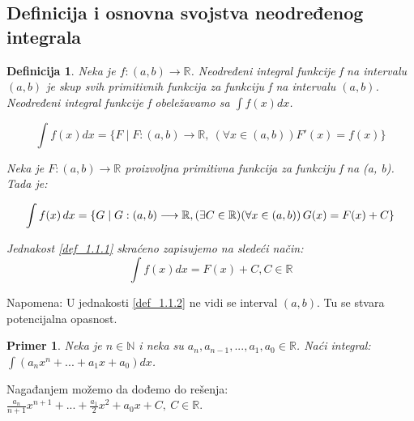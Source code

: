 \documentclass{article}
\newtheorem{definicija}{Definicija}[section]
\newtheorem{prim}{Primer}[section]
\begin{document}
\subsection{Definicija i osnovna svojstva neodređenog integrala}
\begin{definicijabox}
    \begin{definicija}
        Neka je $f: (a, b) \longrightarrow \mathbb{R}$.
        Neodređeni integral funkcije f na intervalu $(a, b)$ je
        skup svih primitivnih funkcija za funkciju f na intervalu
        $(a, b)$. Neodređeni integral funkcije f obeležavamo sa
        $\int f(x)dx$.\par
        $$\int f(x) dx = \{F \mid F: (a, b) \longrightarrow \mathbb{R},\
            (\forall x\in(a,b)) F'(x) = f(x)\}$$\par
        Neka je $F: (a, b) \longrightarrow \mathbb{R}$ proizvoljna
        primitivna funkcija za funkciju f na (a, b). Tada je: \par

        \setcounter{equation}{0}

        \begin{equation} \label{def_1.1.1}
            \int f(x) \, dx =\{G \mid G: (a, b)
            \longrightarrow \mathbb{R}, \\
            (\exists C \in \mathbb{R}) (\forall x \in (a, b))
            \, G(x) = F(x) + C\}
        \end{equation}

        Jednakost \eqref{def_1.1.1} skraćeno zapisujemo na sledeći način:
        \begin{equation}\label{def_1.1.2}
            \int f(x)dx = F(x) + C, C\in\mathbb{R}
        \end{equation}
    \end{definicija}
    Napomena: U jednakosti \eqref{def_1.1.2} ne vidi se interval $(a, b)$.
    Tu se stvara potencijalna opasnost.
\end{definicijabox}

\begin{primbox}
    \begin{prim}
        Neka je $n \in \mathbb{N}$ i neka su $a_n, a_{n-1},
            ..., a_1, a_0 \in \mathbb{R}$. Naći integral:
        $\int (a_n  x^n + ... + a_1 x + a_0)dx$.
    \end{prim}
    Nagađanjem možemo da dođemo do rešenja:\\
    $\frac{a_n}{n+1}x^{n+1} + ... +
        \frac{a_1}{2}x^2 + a_0x + C,\ C\in\mathbb{R}$.
\end{primbox}
\end{document}
